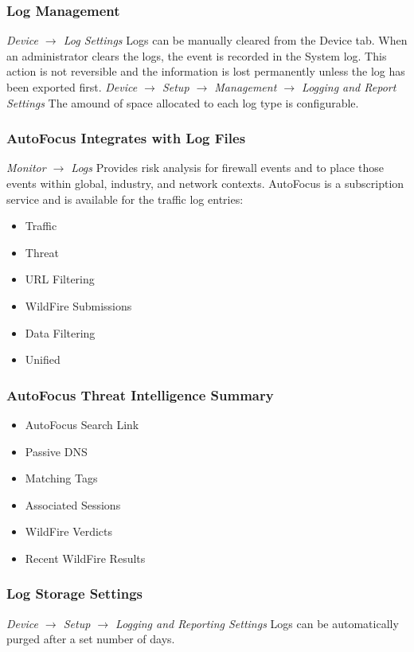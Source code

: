 \subsubsection{Log Management}
\textit{Device $\rightarrow$ Log Settings}
\newline
Logs can be manually cleared from the Device tab. When an administrator clears the logs, the event is recorded in the System log.
This action is not reversible and the information is lost permanently unless the log has been exported first.
\newline
\textit{Device $\rightarrow$ Setup $\rightarrow$ Management $\rightarrow$ Logging and Report Settings}
The amound of space allocated to each log type is configurable. 

\subsubsection{AutoFocus Integrates with Log Files}
\textit{Monitor $\rightarrow$ Logs}
\newline
Provides risk analysis for firewall events and to place those events within global, industry, and network contexts.
AutoFocus is a subscription service and is available for the traffic log entries:
\begin{itemize}
    \item Traffic
    \item Threat
    \item URL Filtering
    \item WildFire Submissions
    \item Data Filtering
    \item Unified
\end{itemize}

\subsubsection{AutoFocus Threat Intelligence Summary}
\begin{itemize}
    \item AutoFocus Search Link
    \item Passive DNS
    \item Matching Tags
    \item Associated Sessions
    \item WildFire Verdicts
    \item Recent WildFire Results
\end{itemize}

\subsubsection{Log Storage Settings}
\textit{Device $\rightarrow$ Setup $\rightarrow$ Logging and Reporting Settings}
\newline
Logs can be automatically purged after a set number of days.

